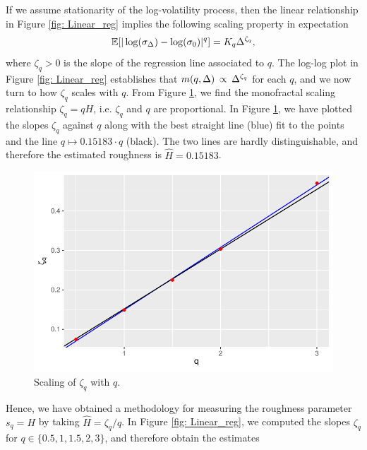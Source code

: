  If we assume stationarity of the log-volatility process, then the linear relationship in Figure \ref{fig: Linear_reg} implies the following scaling property in expectation
 \begin{equation}\label{eq:scaling}
     \mathbb{E}[|\log(\sigma_{\Delta})-\log(\sigma_{0})|^{q}]=K_{q}\Delta^{\zeta_{q}},
 \end{equation}
 where $\zeta_{q}>0$ is the slope of the regression line associated to $q$. The log-log plot in Figure \ref{fig: Linear_reg} establishes that $m(q,\Delta)\hspace{2 pt}\propto\hspace{2 pt} \Delta^{\zeta_{q}}$ for each $q$, and we now turn to how $\zeta_{q}$ scales with $q$. From Figure \ref{fig:slope_plot}, we find the monofractal scaling relationship $\zeta_{q}=qH$, i.e. $\zeta_{q}$ and $q$ are proportional. In Figure \ref{fig:slope_plot}, we have plotted the slopes $\zeta_{q}$ against $q$ along with the best straight line (blue) fit to the points and the line $q\mapsto 0.15183\cdot q$ (black). The two lines are hardly distinguishable, and therefore the estimated roughness is $\hat{H}=0.15183$. 
 \begin{figure}[H]
     \centering
     \includegraphics[scale=0.7]{fig/img/RealizedLib/slope_plot.pdf}
     \caption{Scaling of $\zeta_{q}$ with $q$.}
     \label{fig:slope_plot}
 \end{figure}
 Hence, we have obtained a methodology for measuring the roughness parameter $s_{q}=H$ by taking $\hat{H}=\zeta_{q}/q$. In Figure \ref{fig: Linear_reg}, we computed the slopes $\zeta_{q}$ for $q\in\{0.5,1, 1.5,2,3\}$, and therefore obtain the estimates
